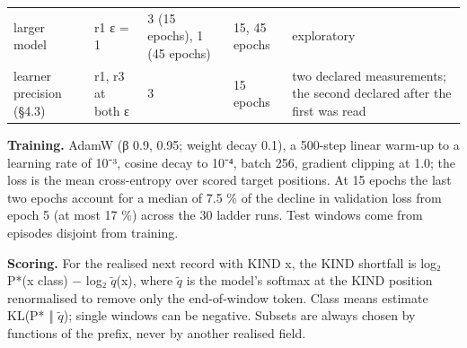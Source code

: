 \documentclass[10pt]{article}
\begin{document}
\begin{longtable}[]{@{}lllll@{}}
\begin{minipage}[t]{0.17\columnwidth}\raggedright
larger model\strut
\end{minipage} & \begin{minipage}[t]{0.17\columnwidth}\raggedright
r1 ε = 1\strut
\end{minipage} & \begin{minipage}[t]{0.17\columnwidth}\raggedright
3 (15 epochs), 1 (45 epochs)\strut
\end{minipage} & \begin{minipage}[t]{0.17\columnwidth}\raggedright
15, 45 epochs\strut
\end{minipage} & \begin{minipage}[t]{0.17\columnwidth}\raggedright
exploratory\strut
\end{minipage}\tabularnewline
\begin{minipage}[t]{0.17\columnwidth}\raggedright
learner precision (§4.3)\strut
\end{minipage} & \begin{minipage}[t]{0.17\columnwidth}\raggedright
r1, r3 at both ε\strut
\end{minipage} & \begin{minipage}[t]{0.17\columnwidth}\raggedright
3\strut
\end{minipage} & \begin{minipage}[t]{0.17\columnwidth}\raggedright
15 epochs\strut
\end{minipage} & \begin{minipage}[t]{0.17\columnwidth}\raggedright
two declared measurements; the second declared after the first was read\strut
\end{minipage}\tabularnewline
\bottomrule
\end{longtable}

\textbf{Training.} AdamW (β 0.9, 0.95; weight decay 0.1), a 500-step linear warm-up to a learning rate of 10⁻³, cosine decay
to 10⁻⁴, batch 256, gradient clipping at 1.0; the loss is the mean cross-entropy over scored target positions. At 15
epochs the last two epochs account for a median of 7.5 \% of the decline in validation loss from epoch 5 (at most 17 \%)
across the 30 ladder runs. Test windows come from episodes disjoint from training.

\textbf{Scoring.} For the realised next record with KIND x, the KIND shortfall is log₂ P*(x \textbar{} class) − log₂ \(\tilde{q}\)(x), where \(\tilde{q}\) is
the model's softmax at the KIND position renormalised to remove only the end-of-window token. Class means estimate
KL(P* ‖ \(\tilde{q}\)); single windows can be negative. Subsets are always chosen by functions of the prefix, never by another
realised field.
\end{document}
